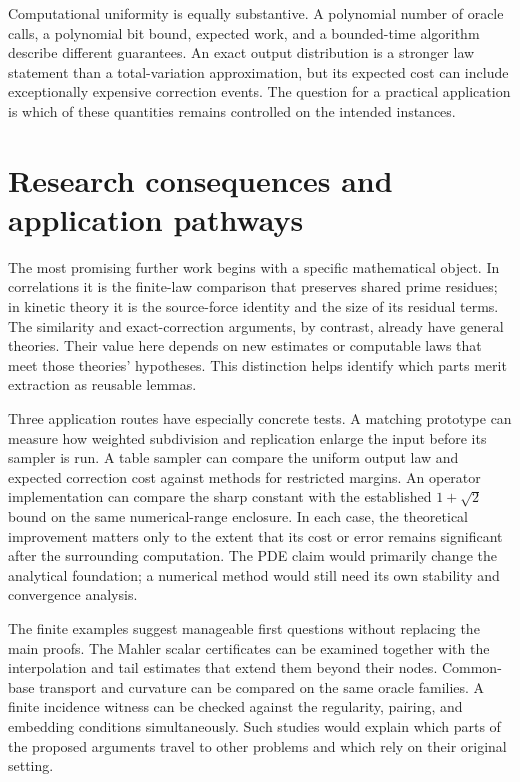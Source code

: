 Computational uniformity is equally substantive. A polynomial number of
oracle calls, a polynomial bit bound, expected work, and a bounded-time
algorithm describe different guarantees. An exact output distribution is
a stronger law statement than a total-variation approximation, but its
expected cost can include exceptionally expensive correction events.
The question for a practical application is which of these quantities
remains controlled on the intended instances.



\section{Research consequences and application pathways}
The most promising further work begins with a specific mathematical
object. In correlations it is the finite-law comparison that preserves
shared prime residues; in kinetic theory it is the source-force identity
and the size of its residual terms. The similarity and exact-correction
arguments, by contrast, already have general theories. Their value here
depends on new estimates or computable laws that meet those theories'
hypotheses. This distinction helps identify which parts merit extraction
as reusable lemmas.

Three application routes have especially concrete tests. A matching
prototype can measure how weighted subdivision and replication enlarge
the input before its sampler is run. A table sampler can compare the
uniform output law and expected correction cost against methods for
restricted margins. An operator implementation can compare the sharp
constant with the established $1+\sqrt2$ bound on the same numerical-range
enclosure. In each case, the theoretical improvement matters only to the
extent that its cost or error remains significant after the surrounding
computation. The PDE claim would primarily change the analytical
foundation; a numerical method would still need its own stability and
convergence analysis.

The finite examples suggest manageable first questions without replacing
the main proofs. The Mahler scalar certificates can be examined together
with the interpolation and tail estimates that extend them beyond their
nodes. Common-base transport and curvature can be compared on the same
oracle families. A finite incidence witness can be checked against the
regularity, pairing, and embedding conditions simultaneously. Such
studies would explain which parts of the proposed arguments travel to
other problems and which rely on their original setting.


